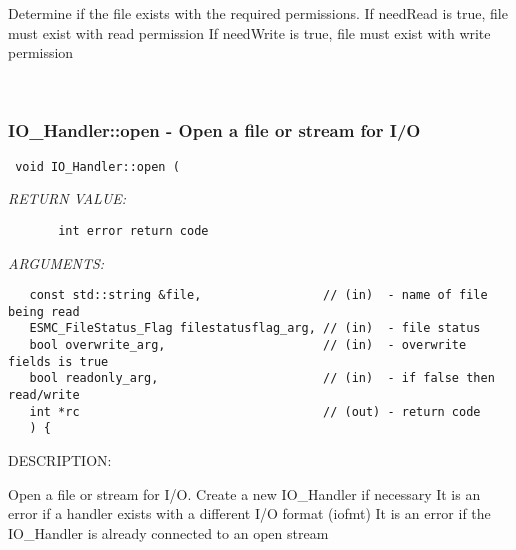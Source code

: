         Determine if the file exists with the required permissions.
        If needRead is true, file must exist with read permission
        If needWrite is true, file must exist with write permission
   
 
\mbox{}\hrulefill\ 
 
\subsubsection [IO\_Handler::open] {IO\_Handler::open - Open a file or stream for I/O}


  
\begin{verbatim} void IO_Handler::open (\end{verbatim}{\em RETURN VALUE:}
\begin{verbatim}       int error return code\end{verbatim}{\em ARGUMENTS:}
\begin{verbatim} 
   const std::string &file,                 // (in)  - name of file being read
   ESMC_FileStatus_Flag filestatusflag_arg, // (in)  - file status
   bool overwrite_arg,                      // (in)  - overwrite fields is true
   bool readonly_arg,                       // (in)  - if false then read/write
   int *rc                                  // (out) - return code
   ) {\end{verbatim}
{\sf DESCRIPTION:\\ }


        Open a file or stream for I/O. Create a new IO_Handler if necessary
        It is an error if a handler exists with a different I/O format (iofmt)
        It is an error if the IO_Handler is already connected to an open stream
  
\setlength{\parskip}{\oldparskip}
\setlength{\parindent}{\oldparindent}
\setlength{\baselineskip}{\oldbaselineskip}
